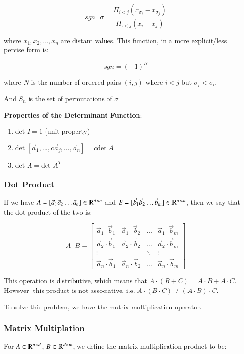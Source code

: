 \documentclass [12 pt, twoside] {book}
\newcommand\+{\text{ }}
\newcommand{\det}{\text{det }}
\begin{document}
$$sgn \+ \sigma = \frac{\Pi_{i < j} (x_{\sigma_i} - x_{\sigma_j})}{\Pi_{i
< j} (x_i - x_j)}$$

where $x_1, x_2, \dots, x_n$ are distant values. This function, in a more
explicit/less percise form is:

$$sgn = (-1)^N$$

where $N$ is the number of ordered pairs $(i, j)$ where $i < j$ but $\sigma_j <
\sigma_i$.

And $S_n$ is the set of permutations of $\sigma$

\textbf{Properties of the Determinant Function}:
\begin{enumerate}
    \item $\det I = 1$ (unit property)
    \item $\det[\vec{a}_1, \dots, c\vec{a}_j, \dots, \vec{a}_n] = c \det A$
    \item $\det A = \det A^T$
\end{enumerate}

\subsubsection{Dot Product}
If we have $A = [\vec{a}_1 \vec{a}_2 \dots \vec{a}_n]
\in \varmathbb{R}^{d \times n}$ and $B = [\vec{b}_1 \vec{b}_2 \dots \vec{b}_m]
\in \varmathbb{R}^{d \times m}$, then we say that the dot product of the two is:

\[
    A \cdot B = \left[\begin{array}{cccc}
        \vec{a}_1 \cdot \vec{b}_1 & \vec{a}_1 \cdot \vec{b}_2 & \dots &
        \vec{a}_1 \cdot \vec{b}_m \\
        \vec{a}_2 \cdot \vec{b}_1 & \vec{a}_2 \cdot \vec{b}_2 & \dots &
        \vec{a}_2 \cdot \vec{b}_m \\
        \vdots & \vdots & \ddots & \vdots\\
        \vec{a}_n \cdot \vec{b}_1 & \vec{a}_n \cdot \vec{b}_2 & \dots &
        \vec{a}_n \cdot \vec{b}_m
    \end{array}\right]
\]

This operation is distributive, which means that $A \cdot (B + C) = A \cdot B +
A \cdot C$. However, this product is not associative, i.e. $A \cdot (B \cdot C)
\neq (A \cdot B) \cdot C$.

To solve this problem, we have the matrix multiplication operator.

\subsubsection{Matrix Multiplation}
For $A \in \varmathbb{R}^{n\times d}$, $B \in
\varmathbb{R}^{d\times m}$, we define the matrix multiplication product to be:
\end{document}
